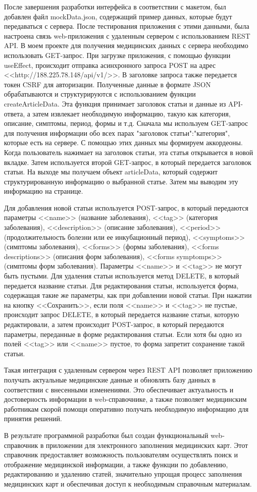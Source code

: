 После завершения разработки интерфейса в соответствии с макетом, был добавлен файл mockData.json, содержащий пример данных, которые будут передаваться с сервера. После тестирования приложения с этими данными, была настроена связь web-приложения с удаленным сервером с использованием REST API. В моем проекте для получения медицинских данных с сервера необходимо использовать GET-запрос. При загрузке приложения, с помощью функции useEffect, происходит отправка асинхронного запроса POST на адрес <<http://188.225.78.148/api/v1/>>. В заголовке запроса также передается токен CSRF для авторизации. Полученные данные в формате JSON обрабатываются и структурируются с использованием функции createArticleData. Эта функция принимает заголовок статьи и данные из API-ответа, а затем извлекает необходимую информацию, такую как категория, описание, симптомы, период, формы и т.д. Сначала мы используем GET-запрос для получения информации обо всех парах "заголовок статьи":"категория", которые есть на сервере. С помощью этих данных мы формируем аккордеоны. Когда пользователь нажимает на заголовок статьи, эта статья открывается в новой вкладке. Затем используется второй GET-запрос, в который передается заголовок статьи. На выходе мы получаем объект articleData, который содержит структурированную информацию о выбранной статье. Затем мы выводим эту информацию на странице.

Для добавления новой статьи используется POST-запрос, в который передаются параметры <<name>> (название заболевания), <<tag>> (категория заболевания), <<description>> (описание заболевания), <<period>> (продолжительность болезни или ее инкубационный период), <<symptoms>> (симптомы заболевания), <<forms>> (формы заболевания), <<forms descriptions>> (описания форм заболевания), <<forms symptomps>> (симптомы форм заболевания). Параметры <<name>> и <<tag>> не могут быть пустыми. Для удаления статьи используется метод DELETE, в который передается название статьи. Для редактирования статьи, используется форма, содержащая такие же параметры, как при добавлении новой статьи. При нажатии на кнопку <<Сохранить>>, если поля <<name>> и <<tag>> не пустые, происходит запрос DELETE, в который передается название статьи, которую редактировали, а затем происходит POST-запрос, в который передаются параметры, переданные в форме редактирования статьи. Если хотя бы одно из полей <<tag>> или <<name>> пустое, то форма запретит сохранение такой статьи.

Такая интеграция с удаленным сервером через REST API позволяет приложению получать актуальные медицинские данные и обновлять базу данных в соответствии с внесенными изменениями. Это обеспечивает актуальность и достоверность информации в web-справочнике, а также позволяет медицинским работникам скорой помощи оперативно получать необходимую информацию для принятия решений.

В результате программной разработки был создан функциональный web-справочник в приложении для электронного заполнения медицинских карт. Этот справочник предоставляет возможность пользователям осуществлять поиск и отображение медицинской информации, а также функции по добавлению, редактированию и удалению статей, значительно упрощая процесс заполнения медицинских карт и обеспечивая доступ к необходимым справочным материалам.
